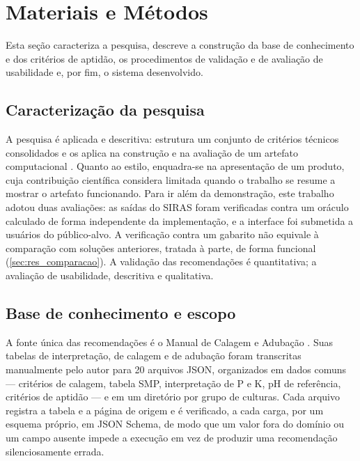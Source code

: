 \section{Materiais e Métodos}\label{sec:metodos}

Esta seção caracteriza a pesquisa, descreve a construção da base de conhecimento e dos
critérios de aptidão, os procedimentos de validação e de avaliação de usabilidade e, por fim,
o sistema desenvolvido.

\subsection{Caracterização da pesquisa}\label{sec:caracterizacao}

A pesquisa é aplicada e descritiva: estrutura um conjunto de critérios técnicos consolidados e
os aplica na construção e na avaliação de um artefato computacional \citep{Wazlawick2014}.
Quanto ao estilo, enquadra-se na apresentação de um produto, cuja contribuição científica
\cite{Wazlawick2014} considera limitada quando o trabalho se resume a mostrar o artefato
funcionando. Para ir além da demonstração, este trabalho adotou duas avaliações: as saídas do
SIRAS foram verificadas contra um oráculo calculado de forma independente da implementação, e a
interface foi submetida a usuários do público-alvo. A verificação contra um gabarito não equivale
à comparação com soluções anteriores, tratada à parte, de forma funcional
(\autoref{sec:res_comparacao}). A validação das recomendações é quantitativa; a avaliação de
usabilidade, descritiva e qualitativa.

\subsection{Base de conhecimento e escopo}\label{sec:base}

A fonte única das recomendações é o Manual de Calagem e Adubação \citep{ManualCalagem2016}.
Suas tabelas de interpretação, de calagem e de adubação foram transcritas manualmente pelo autor
para 20 arquivos JSON, organizados em dados comuns --- critérios de calagem, tabela SMP,
interpretação de P e K, pH de referência, critérios de aptidão --- e em um diretório por grupo de
culturas. Cada arquivo registra a tabela e a página de origem e é verificado, a cada carga, por um
esquema próprio, em JSON Schema, de modo que um valor fora do domínio ou um campo ausente impede a
execução em vez de produzir uma recomendação silenciosamente errada.

